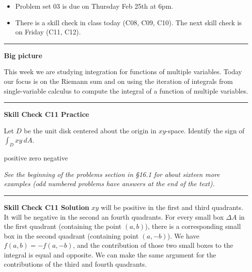 \documentclass[12pt,letterpaper,noanswers]{exam}
\begin{document}
 \pdfpageheight 11in 
  \pdfpagewidth 8.5in





\begin{itemize}
\itemsep0em
    \item Problem set 03 is due on Thursday Feb 25th at 6pm.
    \item There is a skill check in class today (C08, C09, C10).  The next skill check is on Friday (C11, C12).
\end{itemize}

\hrule
\vspace{0.2cm}


\noindent\textbf{Big picture}

This week we are studying integration for functions of multiple variables.  Today our focus is on the Riemann sum and on using the iteration of integrals from single-variable calculus to compute the integral of a function of multiple variables.

\vspace{0.2cm}
\hrule
\vspace{0.2cm}
\noindent\textbf{Skill Check C11 Practice}

\begin{questions}
\item Let $D$ be the unit disk centered about the origin in $xy$-space.  Identify the sign of $\int_D xy\ dA$.
\begin{oneparcheckboxes}
\choice positive
\choice zero
\choice negative
\end{oneparcheckboxes}

\emph{See the beginning of the problems section in \S 16.1 for about sixteen more examples (odd numbered problems have answers at the end of the text).}
\end{questions}

\vspace{0.2cm}
\hrule
\vspace{0.2cm}

\noindent\textbf{Skill Check C11 Solution}
$xy$ will be positive in the first and third quadrants.  It will be negative in the second an fourth quadrants.  For every small box $\Delta A$ in the first quadrant (containing the point $(a,b)$), there is a corresponding small box in the second quadrant (containing point $(a,-b)$).  We have $f(a,b) = -f(a,-b)$, and the contribution of those two small boxes to the integral is equal and opposite.  We can make the same argument for the contributions of the third and fourth quadrants.
\end{document}
